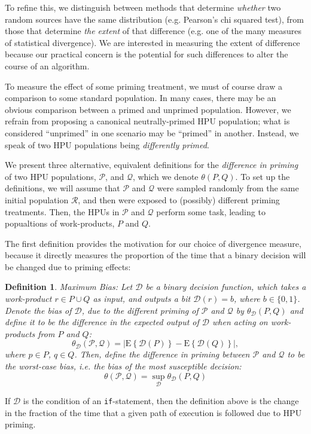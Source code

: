 \documentclass[12pt]{article}
\newtheorem{mydef}{Definition}
\begin{document}
To refine this, we distinguish between methods that determine \textit{whether}
two random sources have the same distribution 
(e.g. Pearson's chi squared test), from those that determine
\textit{the extent} of that difference (e.g. one of the many measures of 
statistical divergence).  We are interested in measuring the extent of
difference because our practical concern is the potential for such
differences to alter the course of an algorithm.

To measure the effect of some priming treatment, we must of course draw a 
comparison to some standard population.  In many cases, there may be an 
obvious comparison between a primed and unprimed population.  However, we 
refrain from proposing a canonical neutrally-primed HPU population; what is 
considered ``unprimed'' in one scenario may be ``primed'' in another. 
Instead, we speak of two HPU populations being \textit{differently primed}.

We present three alternative, equivalent definitions for the 
\textit{difference in priming} of two HPU populations, $\mathcal{P}$, and 
$\mathcal{Q}$, which we denote $\theta(P,Q)$.  To set up the definitions,
we will assume that $\mathcal{P}$ and $\mathcal{Q}$ 
were sampled randomly from the same initial population $\mathcal{R}$, and 
then were exposed to (possibly) different priming treatments. Then, the HPUs 
in $\mathcal{P}$ and $\mathcal{Q}$ perform some task, leading to popualtions 
of work-products, $P$ and $Q$.

The first definition provides the motivation for our choice of divergence
measure, because it directly measures the proportion of the time that a
binary decision will be changed due to priming effects:

\begin{mydef}
	\label{def:bias}
	{\upshape Maximum Bias:}
	Let $\mathcal{D}$ be a binary decision function, which takes a 
	work-product
	$r \in P \cup Q$ as input, and outputs a bit $\mathcal{D}(r)=b$, where 
	$b \in \{0,1\}$. Denote the \emph{bias} of $\mathcal{D}$, due to the
	different priming of $\mathcal{P}$ and $\mathcal{Q}$ by
	$\theta_\mathcal{D}(P,Q)$ and define it to be the difference 
	in the expected output of $\mathcal{D}$ when acting on work-products from 
	$P$ and $Q$:
	$$
	\theta_\mathcal{D}(\mathcal{P},\mathcal{Q}) = 
		\left| 
			\mathrm{E}\left\{ \mathcal{D}(P) \right\} 
			- \mathrm{E}\left\{ \mathcal{D}(Q) \right\} 
		\right|,
	$$
	where $p \in P$, $q \in Q$.  Then, define the difference in priming 
	between $\mathcal{P}$ and $\mathcal{Q}$ to be the worst-case bias, i.e. 
	the bias of the most susceptible decision:
	$$
	\theta(\mathcal{P},\mathcal{Q}) = 
		\sup_\mathcal{D} \theta_\mathcal{D}(P,Q)
	$$
\end{mydef}
If $\mathcal{D}$ is the condition of an \texttt{if}-statement, then the 
definition above is the change in the fraction of the time that a given 
path of execution is followed due to HPU priming.
\end{document}
